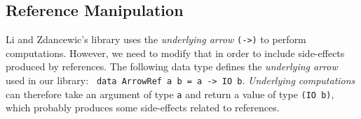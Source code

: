 \documentclass[times, 10pt,twocolumn]{article}
\begin{document}
\subsection{Reference Manipulation}

Li and Zdancewic's library uses the \emph{underlying arrow}
\texttt{(->)} to perform computations. However, we need to 
modify that in order to include side-effects produced by references.
The following data type defines the \emph{underlying arrow} used in 
our library: \texttt{
data ArrowRef a b = a -> IO b}.
%
\emph{Underlying computations} can therefore take an argument of type
\texttt{a} and return a value of type \texttt{(IO b)}, which probably
produces some side-effects related to references.
\end{document}

